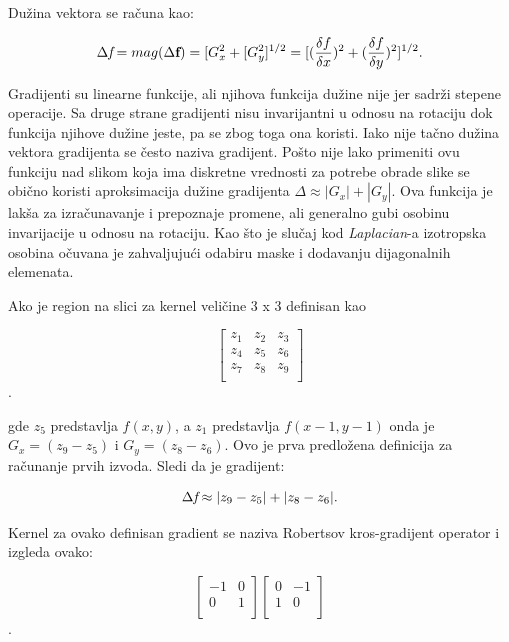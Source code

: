 \documentclass[a4paper,12pt,titlepage]{article}
\begin{document}
Dužina vektora se računa kao: 

\begin{equation}\label{eq:grad12}
	\Delta \emph{f} = mag(\Delta \textbf{f}) = [G_{x}^{2} + [G_{y}^{2}]^{1/2} = [ (\dfrac{\delta f}{\delta x})^{2} +  (\dfrac{\delta f}{\delta y})^{2} ]^{1/2}. 
\end{equation}

Gradijenti su linearne funkcije, ali njihova funkcija dužine nije jer sadrži stepene operacije. Sa druge strane gradijenti nisu invarijantni u odnosu na rotaciju dok funkcija njihove dužine jeste, pa se zbog toga ona koristi. Iako nije tačno dužina vektora gradijenta se često naziva gradijent. Pošto nije lako primeniti ovu funkciju nad slikom koja ima diskretne vrednosti za potrebe obrade slike se obično koristi aproksimacija dužine gradijenta $\Delta \approx |G_{x}| + |G_{y}|$. Ova funkcija je lakša za izračunavanje i prepoznaje promene, ali generalno gubi osobinu invarijacije u odnosu na rotaciju. Kao što je slučaj kod \emph{Laplacian}-a izotropska osobina očuvana je zahvaljujući odabiru maske i dodavanju dijagonalnih elemenata. 

Ako je region na slici za kernel veličine 3 x 3 definisan kao

 \[
\begin{bmatrix}
     z_{1} & z_{2} & z_{3} \\
     z_{4} & z_{5} & z_{6} \\
     z_{7} & z_{8} & z_{9} \\
\end{bmatrix}
\].

gde $z_{5}$ predstavlja $f(x, y)$, a $z_{1}$ predstavlja $f(x - 1, y - 1)$ onda je $G_{x} = (z_{9} - z_{5})$ i $G_{y} = (z_{8} - z_{6})$. Ovo je prva predložena definicija za računanje prvih izvoda. Sledi da je gradijent:

\begin{equation}\label{eq:grad13}
\Delta \emph{f} \approx |z_{9} - z_{5}| + |z_{8} - z_{6}|.
\end{equation}

Kernel za ovako definisan gradient se naziva Robertsov kros-gradijent operator i izgleda ovako:

 \[
\begin{bmatrix}
     -1 & 0 \\
     0 & 1 \\
\end{bmatrix}
\begin{bmatrix}
     0 & -1 \\
     1 & 0 \\
\end{bmatrix}
\].
\end{document}
